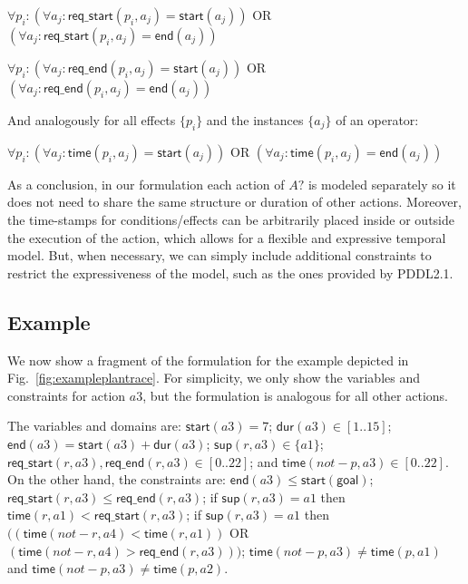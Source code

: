 \documentclass[runningheads]{llncs}
\newcommand{\dur}{\mathsf{dur}}    %
\newcommand{\start}{\mathsf{start}}%
\newcommand{\en}{\mathsf{end}}     %
\newcommand{\supp}{\mathsf{sup}}   %
\newcommand{\tim}{\mathsf{time}}   %
\newcommand{\reqs}{\mathsf{req\_{start}}} %
\newcommand{\reqe}{\mathsf{req\_{end}}}   %
\newcommand{\goal}{\mathsf{goal}}  %
\begin{document}
$\forall p_i: (\forall a_j: \reqs(p_i,a_j) = \start(a_j))$ OR $(\forall a_j: \reqs(p_i,a_j) = \en(a_j))$

$\forall p_i: (\forall a_j: \reqe(p_i,a_j) = \start(a_j))$ OR $(\forall a_j: \reqe(p_i,a_j) = \en(a_j))$

And analogously for all effects $\{p_i\}$ and the instances $\{a_j\}$ of an operator:

$\forall p_i: (\forall a_j: \tim(p_i,a_j) = \start(a_j))$ OR $(\forall a_j: \tim(p_i,a_j) = \en(a_j))$


As a conclusion, in our formulation each action of $A?$ is modeled separately so it does not need to share the same structure or duration of other actions. Moreover, the time-stamps for conditions/effects can be arbitrarily placed inside or outside the execution of the action, which allows for a flexible and expressive temporal model. But, when necessary, we can simply include additional constraints to restrict the expressiveness of the model, such as the ones provided by PDDL2.1.


\subsection{Example}
\label{sec:example}

We now show a fragment of the formulation for the example depicted in Fig.~\ref{fig:exampleplantrace}. For simplicity, we only show the variables and constraints for action $a3$, but the formulation is analogous for all other actions.

The variables and domains are: $\start(a3)=7$; $\dur(a3) \in [1..15]$; $\en(a3)=\start(a3)+\dur(a3)$; $\supp(r,a3) \in \{a1\}$; $\reqs(r,a3),\reqe(r,a3) \in [0..22]$; and $\tim(not-p,a3) \in [0..22]$.
On the other hand, the constraints are: $\en(a3) \leq \start(\goal)$; $\reqs(r,a3) \leq \reqe(r,a3)$; if $\supp(r,a3)=a1$ then $\tim(r,a1) < \reqs(r,a3)$; if $\supp(r,a3)=a1$ then $((\tim(not-r,a4) < \tim(r,a1))$ OR $(\tim(not-r,a4) > \reqe(r,a3)))$; $\tim(not-p,a3) \neq \tim(p,a1)$ and $\tim(not-p,a3) \neq \tim(p,a2)$.
\end{document}
